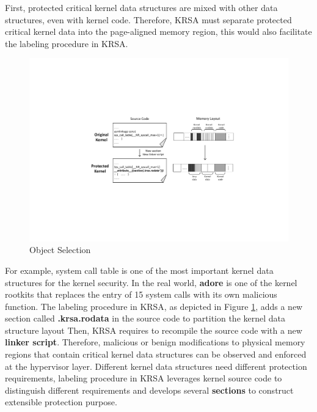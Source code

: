 \documentclass[conference]{IEEEtran}
\begin{document}
First, protected critical kernel data structures are mixed with other data structures, even with kernel code. Therefore, KRSA must separate protected critical kernel data into the page-aligned memory region, this would also facilitate the labeling procedure in KRSA. 
\begin{figure}
    \centering
    \includegraphics[scale=0.5]{pic/data_aggregate.pdf}
    \caption{Object Selection}
    \label{recompile}
\end{figure}
For example, system call table is one of the most important kernel data structures for the kernel security. In the real world, \textbf{adore} is one of the kernel rootkits that replaces the entry of 15 system calls with its own malicious function. The labeling procedure in KRSA, as depicted in Figure \ref{recompile}, 
adds a new section called \textbf{.krsa.rodata} in the source code to partition the kernel data structure layout
Then, KRSA requires to recompile the source code with a new \textbf{linker script}. Therefore, malicious or benign modifications to physical memory regions that contain critical kernel data structures can be observed and enforced at the hypervisor layer. 
Different kernel data structures need different protection requirements, labeling procedure in KRSA leverages kernel source code to distinguish different requirements and develops several \textbf{sections} to construct extensible protection purpose. 

\end{document}
